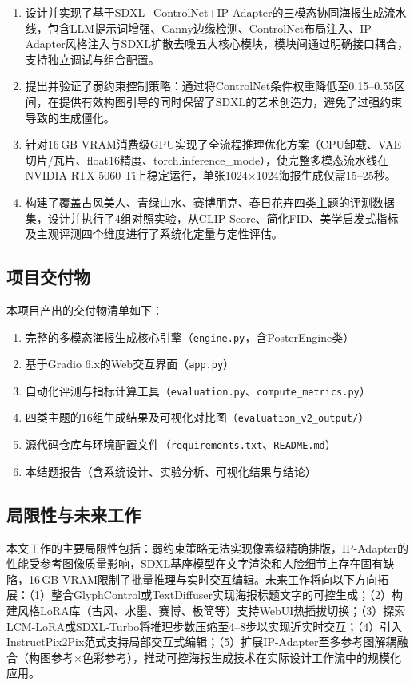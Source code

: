 \documentclass[12pt,a4paper]{ctexart}
\begin{document}
\begin{enumerate}[itemsep=1pt,topsep=4pt]
    \item 设计并实现了基于SDXL+ControlNet+IP-Adapter的三模态协同海报生成流水线，包含LLM提示词增强、Canny边缘检测、ControlNet布局注入、IP-Adapter风格注入与SDXL扩散去噪五大核心模块，模块间通过明确接口耦合，支持独立调试与组合配置。
    \item 提出并验证了弱约束控制策略：通过将ControlNet条件权重降低至0.15--0.55区间，在提供有效构图引导的同时保留了SDXL的艺术创造力，避免了过强约束导致的生成僵化。
    \item 针对16\,GB VRAM消费级GPU实现了全流程推理优化方案（CPU卸载、VAE切片/瓦片、float16精度、torch.inference\_mode），使完整多模态流水线在NVIDIA RTX 5060 Ti上稳定运行，单张1024$\times$1024海报生成仅需15--25秒。
    \item 构建了覆盖古风美人、青绿山水、赛博朋克、春日花卉四类主题的评测数据集，设计并执行了4组对照实验，从CLIP Score、简化FID、美学启发式指标及主观评测四个维度进行了系统化定量与定性评估。
\end{enumerate}

\subsection*{项目交付物}

本项目产出的交付物清单如下：

\begin{enumerate}[itemsep=1pt,topsep=4pt]
    \item 完整的多模态海报生成核心引擎（\texttt{engine.py}，含PosterEngine类）
    \item 基于Gradio 6.x的Web交互界面（\texttt{app.py}）
    \item 自动化评测与指标计算工具（\texttt{evaluation.py}、\texttt{compute\_metrics.py}）
    \item 四类主题的16组生成结果及可视化对比图（\texttt{evaluation\_v2\_output/}）
    \item 源代码仓库与环境配置文件（\texttt{requirements.txt}、\texttt{README.md}）
    \item 本结题报告（含系统设计、实验分析、可视化结果与结论）
\end{enumerate}

\subsection*{局限性与未来工作}

本文工作的主要局限性包括：弱约束策略无法实现像素级精确排版，IP-Adapter的性能受参考图像质量影响，SDXL基座模型在文字渲染和人脸细节上存在固有缺陷，16\,GB VRAM限制了批量推理与实时交互编辑。未来工作将向以下方向拓展：（1）整合GlyphControl或TextDiffuser实现海报标题文字的可控生成；（2）构建风格LoRA库（古风、水墨、赛博、极简等）支持WebUI热插拔切换；（3）探索LCM-LoRA或SDXL-Turbo将推理步数压缩至4--8步以实现近实时交互；（4）引入InstructPix2Pix范式支持局部交互式编辑；（5）扩展IP-Adapter至多参考图解耦融合（构图参考$\times$色彩参考），推动可控海报生成技术在实际设计工作流中的规模化应用。
\end{document}
